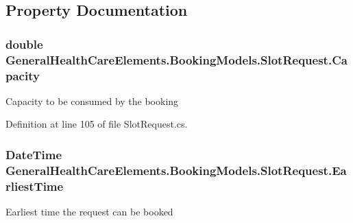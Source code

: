 \subsection{Property Documentation}
\subsubsection[{\texorpdfstring{Capacity}{Capacity}}]{\setlength{\rightskip}{0pt plus 5cm}double General\+Health\+Care\+Elements.\+Booking\+Models.\+Slot\+Request.\+Capacity\hspace{0.3cm}{\ttfamily [get]}}\hypertarget{class_general_health_care_elements_1_1_booking_models_1_1_slot_request_ac8977479089d801cdd7407ea8da88ab8}{}\label{class_general_health_care_elements_1_1_booking_models_1_1_slot_request_ac8977479089d801cdd7407ea8da88ab8}


Capacity to be consumed by the booking 



Definition at line 105 of file Slot\+Request.\+cs.

\subsubsection[{\texorpdfstring{Earliest\+Time}{EarliestTime}}]{\setlength{\rightskip}{0pt plus 5cm}Date\+Time General\+Health\+Care\+Elements.\+Booking\+Models.\+Slot\+Request.\+Earliest\+Time\hspace{0.3cm}{\ttfamily [get]}}\hypertarget{class_general_health_care_elements_1_1_booking_models_1_1_slot_request_aeb35570bf9da9877e7dd513d84097df1}{}\label{class_general_health_care_elements_1_1_booking_models_1_1_slot_request_aeb35570bf9da9877e7dd513d84097df1}


Earliest time the request can be booked 



